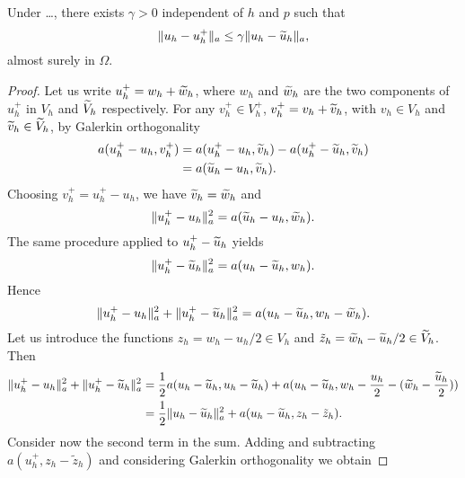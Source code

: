 \documentclass[10pt]{article}
\begin{document}
\begin{lemma} Under \ldots, there exists $\gamma > 0$ independent of $h$ and $p$ such that
	\begin{equation}
		\lVert u_h - u_h^+\rVert_a \leq \gamma \lVert u_h - \widetilde u_h\rVert_a,
	\end{equation}
	almost surely in $\Omega$.
\end{lemma}
\begin{proof} Let us write $u_h^+ = w_h + \widetilde w_h$, where $w_h$ and $\widetilde w_h$ are the two components of $u^+_h$ in $V_h$ and $\widetilde V_h$ respectively. For any $v_h^+ \in V_h^+$, $v_h^+ = v_h + \widetilde v_h$, with $v_h \in V_h$ and $\widetilde v_h \in \widetilde V_h$, by Galerkin orthogonality 
	\begin{equation}
	\begin{aligned}
		a(u_h^+ - u_h, v_h^+) &= a(u_h^+ - u_h, \widetilde v_h) - a(u_h^+ - \widetilde u_h, \widetilde v_h) \\
		&= a(\widetilde u_h - u_h, \widetilde v_h).
	\end{aligned}
	\end{equation}
	Choosing $v_h^+ = u_h^+ - u_h$, we have $\widetilde v_h = \widetilde w_h$ and 
	\begin{equation}
		\lVert u_h^+ - u_h\rVert_a^2 = a(\widetilde u_h - u_h, \widetilde w_h).
	\end{equation}
	The same procedure applied to $u_h^+ - \widetilde u_h$ yields
	\begin{equation}
		\lVert u_h^+ - \widetilde u_h\rVert_a^2 = a(u_h - \widetilde u_h, w_h).
	\end{equation}
	Hence
	\begin{equation}
		\lVert u_h^+ - u_h\rVert_a^2 + \lVert u_h^+ - \widetilde u_h\rVert_a^2 = a(u_h - \widetilde u_h, w_h - \widetilde w_h).
	\end{equation}
	Let us introduce the functions $z_h = w_h - u_h/2 \in V_h$ and $\tilde z_h = \widetilde w_h - \widetilde u_h /2 \in \widetilde V_h$. Then
	\begin{equation}
	\begin{aligned}
		\lVert u_h^+ - u_h\rVert_a^2 + \lVert u_h^+ - \widetilde u_h\rVert_a^2 &= \frac12 a(u_h - \widetilde u_h, u_h - \widetilde u_h) + a(u_h - \widetilde u_h, w_h - \frac{u_h}{2} - (\widetilde w_h - \frac{\widetilde u_h}{2}))\\
		&= \frac{1}{2} \lVert u_h - \widetilde u_h\rVert_a^2 + a(u_h - \widetilde u_h, z_h - \tilde z_h).
	\end{aligned}
	\end{equation} 
	Consider now the second term in the sum. Adding and subtracting $a(u_h^+, z_h - \tilde z_h)$ and considering Galerkin orthogonality we obtain

\end{proof}
\end{document}
